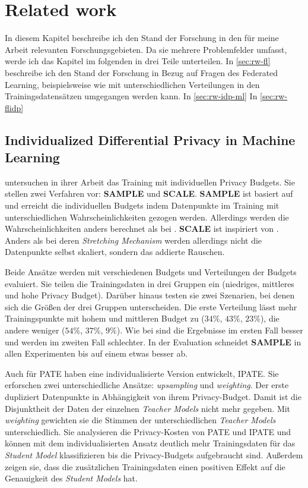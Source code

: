 \chapter{Related work}

In diesem Kapitel beschreibe ich den Stand der Forschung in den für meine Arbeit relevanten Forschungsgebieten. Da sie mehrere Problemfelder umfasst, werde ich das Kapitel im folgenden in drei Teile unterteilen. In \autoref{sec:rw-fl} beschreibe ich den Stand der Forschung in Bezug auf Fragen des Federated Learning, beispielsweise wie mit unterschiedlichen Verteilungen in den Trainingsdatensätzen umgegangen werden kann. In \autoref{sec:rw-idp-ml}
In \autoref{sec:rw-flidp}

\section{Individualized Differential Privacy in Machine Learning}\label{sec:rw-idp-ml}

\textcite{boenisch:2023} untersuchen in ihrer Arbeit das Training mit individuellen Privacy Budgets. Sie stellen zwei Verfahren vor: \textbf{SAMPLE} und \textbf{SCALE}. \textbf{SAMPLE} ist basiert auf \textcite{jorgensen:2015} und erreicht die individuellen Budgets indem Datenpunkte im Training mit unterschiedlichen Wahrscheinlichkeiten gezogen werden. Allerdings werden die Wahrscheinlichkeiten anders berechnet als bei \textcite{jorgensen:2015}. \textbf{SCALE} ist inspiriert von \textcite{alaggan:2016}. Anders als bei deren \textit{Stretching Mechanism} werden allerdings nicht die Datenpunkte selbst skaliert, sondern das addierte Rauschen. 

Beide Ansätze werden mit verschiedenen Budgets und Verteilungen der Budgets evaluiert. Sie teilen die Trainingsdaten in drei Gruppen ein (niedriges, mittleres und hohe Privacy Budget). Darüber hinaus testen sie zwei Szenarien, bei denen sich die Größen der drei Gruppen unterscheiden. Die erste Verteilung lässt mehr Trainingspunkte mit hohem und mittleren Budget zu ($34\%$, $43\%$, $23\%$), die andere weniger ($54\%$, $37\%$, $9\%$). Wie bei \textcite{jorgensen:2015} sind die Ergebnisse im ersten Fall besser und werden im zweiten Fall schlechter. In der Evaluation schneidet \textbf{SAMPLE} in allen Experimenten bis auf einem etwas besser ab.

Auch für PATE haben \textcite{boenisch:2023b} eine individualisierte Version entwickelt, IPATE. Sie erforschen zwei unterschiedliche Ansätze: \textit{upsampling} und \textit{weighting}. Der erste dupliziert Datenpunkte in Abhängigkeit von ihrem Privacy-Budget. Damit ist die Disjunktheit der Daten der einzelnen \textit{Teacher Models} nicht mehr gegeben. Mit \textit{weighting} gewichten sie die Stimmen der unterschiedlichen \textit{Teacher Models} unterschiedlich. Sie analysieren die Privacy-Kosten von PATE und IPATE und können mit dem individualisierten Ansatz deutlich mehr Trainingsdaten für das \textit{Student Model} klassifizieren bis die Privacy-Budgets aufgebraucht sind. Außerdem zeigen sie, dass die zusätzlichen Trainingsdaten einen positiven Effekt auf die Genauigkeit des \textit{Student Models} hat.

